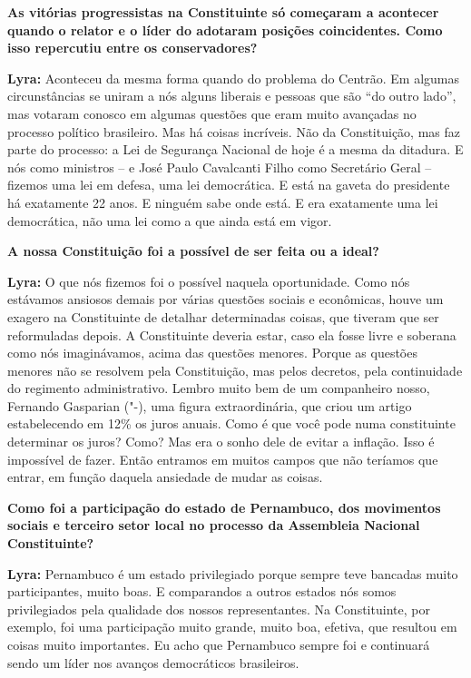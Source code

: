 \textbf{As vitórias progressistas na Constituinte só começaram a
acontecer quando o relator e o líder do  adotaram posições
coincidentes. Como isso repercutiu entre os conservadores?}

\textbf{Lyra:} Aconteceu da mesma forma quando do problema do Centrão.
Em algumas circunstâncias se uniram a nós alguns liberais e pessoas que
são ``do outro lado'', mas votaram conosco em algumas questões que eram
muito avançadas no processo político brasileiro. Mas há coisas
incríveis. Não da Constituição, mas faz parte do processo: a Lei de
Segurança Nacional de hoje é a mesma da ditadura. E nós como ministros
-- e José Paulo Cavalcanti Filho como Secretário Geral -- fizemos uma
lei em defesa, uma lei democrática. E está na gaveta do presidente há
exatamente 22 anos. E ninguém sabe onde está. E era exatamente uma lei
democrática, não uma lei como a que ainda está em vigor.

\textbf{A nossa Constituição foi a possível de ser feita ou a ideal?}

\textbf{Lyra:} O que nós fizemos foi o possível naquela oportunidade.
Como nós estávamos ansiosos demais por várias questões sociais e
econômicas, houve um exagero na Constituinte de detalhar determinadas
coisas, que tiveram que ser reformuladas depois. A Constituinte deveria
estar, caso ela fosse livre e soberana como nós imaginávamos, acima das
questões menores. Porque as questões menores não se resolvem pela
Constituição, mas pelos decretos, pela continuidade do regimento
administrativo. Lembro muito bem de um companheiro nosso, Fernando
Gasparian ("-), uma figura extraordinária, que criou um artigo
estabelecendo em 12\% os juros anuais. Como é que você pode numa
constituinte determinar os juros? Como? Mas era o sonho dele de evitar a
inflação. Isso é impossível de fazer. Então entramos em muitos campos
que não teríamos que entrar, em função daquela ansiedade de mudar as
coisas.

\textbf{Como foi a participação do estado de Pernambuco, dos movimentos
sociais e terceiro setor local no processo da Assembleia Nacional
Constituinte?}

\textbf{Lyra:} Pernambuco é um estado privilegiado porque sempre teve
bancadas muito participantes, muito boas. E comparandos a outros estados
nós somos privilegiados pela qualidade dos nossos representantes. Na
Constituinte, por exemplo, foi uma participação muito grande, muito boa,
efetiva, que resultou em coisas muito importantes. Eu acho que
Pernambuco sempre foi e continuará sendo um líder nos avanços
democráticos brasileiros.

